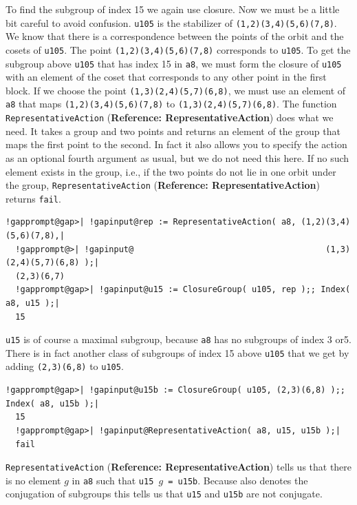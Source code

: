 \documentclass[a4paper,11pt]{report}
\begin{document}
{{ To find the subgroup of index 15 we again use closure. Now we must be a little
bit careful to avoid confusion. \texttt{u105} is the stabilizer of \texttt{(1,2)(3,4)(5,6)(7,8)}. We know that there is a correspondence between the points of the orbit and
the cosets of \texttt{u105}. The point \texttt{(1,2)(3,4)(5,6)(7,8)} corresponds to \texttt{u105}. To get the subgroup above \texttt{u105} that has index 15 in \texttt{a8}, we must form the closure of \texttt{u105} with an element of the coset that corresponds to any other point in the first
block. If we choose the point \texttt{(1,3)(2,4)(5,7)(6,8)}, we must use an element of \texttt{a8} that maps \texttt{(1,2)(3,4)(5,6)(7,8)} to \texttt{(1,3)(2,4)(5,7)(6,8)}. The function \texttt{RepresentativeAction} (\textbf{Reference: RepresentativeAction}) does what we need. It takes a group and two points and returns an element of
the group that maps the first point to the second. In fact it also allows you
to specify the action as an optional fourth argument as usual, but we do not
need this here. If no such element exists in the group, i.e., if the two
points do not lie in one orbit under the group, \texttt{RepresentativeAction} (\textbf{Reference: RepresentativeAction}) returns \texttt{fail}. 

 
\begin{Verbatim}[commandchars=!@|,fontsize=\small,frame=single,label=Example]
  !gapprompt@gap>| !gapinput@rep := RepresentativeAction( a8, (1,2)(3,4)(5,6)(7,8),|
  !gapprompt@>| !gapinput@                                       (1,3)(2,4)(5,7)(6,8) );|
  (2,3)(6,7)
  !gapprompt@gap>| !gapinput@u15 := ClosureGroup( u105, rep );; Index( a8, u15 );|
  15
\end{Verbatim}
 

 \texttt{u15} is of course a maximal subgroup, because \texttt{a8} has no subgroups of index 3 or{\nobreakspace}5. There is in fact another class
of subgroups of index 15 above \texttt{u105} that we get by adding \texttt{(2,3)(6,8)} to \texttt{u105}. 

 
\begin{Verbatim}[commandchars=!@|,fontsize=\small,frame=single,label=Example]
  !gapprompt@gap>| !gapinput@u15b := ClosureGroup( u105, (2,3)(6,8) );; Index( a8, u15b );|
  15
  !gapprompt@gap>| !gapinput@RepresentativeAction( a8, u15, u15b );|
  fail
\end{Verbatim}
 

 \texttt{RepresentativeAction} (\textbf{Reference: RepresentativeAction}) tells us that there is no element $g$ in \texttt{a8} such that \texttt{u15 \texttt{} }$g$\texttt{ = u15b}. Because \texttt{\texttt{}} also denotes the conjugation of subgroups this tells us that \texttt{u15} and \texttt{u15b} are not conjugate. 

}}
\end{document}
